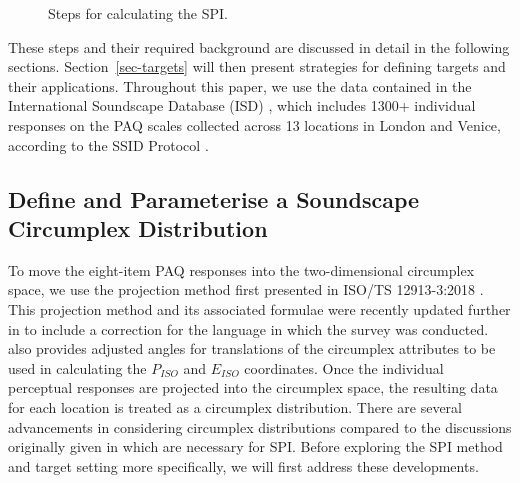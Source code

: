 \documentclass[
  authoryear,
  3p]{elsarticle}
\begin{document}
\begin{figure}


\caption{\label{fig-bespoke-spi}Steps for calculating the SPI.}

\end{figure}%

These steps and their required background are discussed in detail in the
following sections. Section~\ref{sec-targets} will then present
strategies for defining targets and their applications. Throughout this
paper, we use the data contained in the International Soundscape
Database (ISD) \citep{Mitchell2024International}, which includes 1300+
individual responses on the PAQ scales collected across 13 locations in
London and Venice, according to the SSID Protocol
\citep{Mitchell2020Soundscape}.

\subsection{Define and Parameterise a Soundscape Circumplex
Distribution}\label{sec-circumplex-distribution}

To move the eight-item PAQ responses into the two-dimensional circumplex
space, we use the projection method first presented in ISO/TS
12913-3:2018 \citep{ISO12913Part3}. This projection method and its
associated formulae were recently updated further in
\citet{Aletta2024Soundscape} to include a correction for the language in
which the survey was conducted. \citet{Aletta2024Soundscape} also
provides adjusted angles for translations of the circumplex attributes
to be used in calculating the \(P_{ISO}\) and \(E_{ISO}\) coordinates.
Once the individual perceptual responses are projected into the
circumplex space, the resulting data for each location is treated as a
circumplex distribution. There are several advancements in considering
circumplex distributions compared to the discussions originally given in
\citet{Mitchell2022How} which are necessary for SPI. Before exploring
the SPI method and target setting more specifically, we will first
address these developments.
\end{document}
